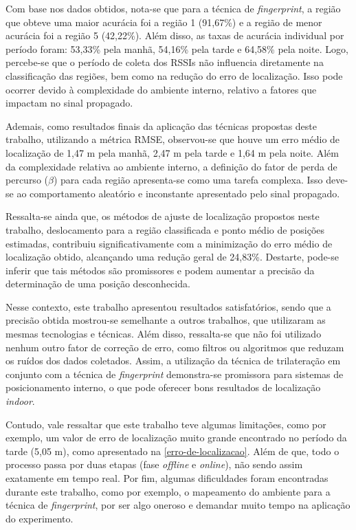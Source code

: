\documentclass[12pt]{artigoifce}
\begin{document}
Com base nos dados obtidos, nota-se que para a técnica de \textit{fingerprint}, a região que obteve uma maior acurácia foi a região 1 (91,67\%) e a região de menor acurácia foi a região 5 (42,22\%). Além disso, as taxas de acurácia individual por período foram: 53,33\% pela manhã, 54,16\% pela tarde e 64,58\% pela noite. Logo, percebe-se que o período de coleta dos RSSIs não influencia diretamente na classificação das regiões, bem como na redução do erro de localização. Isso pode ocorrer devido à complexidade do ambiente interno, relativo a fatores que impactam no sinal propagado.

Ademais, como resultados finais da aplicação das técnicas propostas deste trabalho, utilizando a métrica RMSE, observou-se que houve um erro médio de localização de 1,47 m pela manhã, 2,47 m pela tarde e 1,64 m pela noite. Além da complexidade relativa ao ambiente interno, a definição do fator de perda de percurso ($\beta$) para cada região apresenta-se como uma tarefa complexa. Isso deve-se ao comportamento aleatório e inconstante apresentado pelo sinal propagado.

Ressalta-se ainda que, os métodos de ajuste de localização propostos neste trabalho, deslocamento para a região classificada e ponto médio de posições estimadas, contribuiu significativamente com a minimização do erro médio de localização obtido, alcançando uma redução geral de 24,83\%. Destarte, pode-se inferir que tais métodos são promissores e podem aumentar a precisão da determinação de uma posição desconhecida.

Nesse contexto, este trabalho apresentou resultados satisfatórios, sendo que a precisão obtida mostrou-se semelhante a outros trabalhos, que utilizaram as mesmas tecnologias e técnicas. Além disso, ressalta-se que não foi utilizado nenhum outro fator de correção de erro, como filtros ou algoritmos que reduzam os ruídos dos dados coletados. Assim, a utilização da técnica de trilateração em conjunto com a técnica de \textit{fingerprint} demonstra-se promissora para sistemas de posicionamento interno, o que pode oferecer bons resultados de localização \textit{indoor}.

Contudo, vale ressaltar que este trabalho teve algumas limitações, como por exemplo, um valor de erro de localização muito grande encontrado no período da tarde (5,05 m), como apresentado na \autoref{erro-de-localizacao}. Além de que, todo o processo passa por duas etapas (fase \textit{offline} e \textit{online}), não sendo assim exatamente em tempo real. Por fim, algumas dificuldades foram encontradas durante este trabalho, como por exemplo, o mapeamento do ambiente para a técnica de \textit{fingerprint}, por ser algo oneroso e demandar muito tempo na aplicação do experimento.
\end{document}
